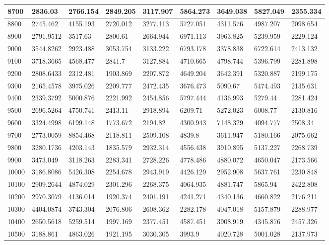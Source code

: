 \documentclass [11pt, proquest] {uwthesis}[2020/12/20]
\begin{document}
\begin{table}[]
\begin{tiny}
\begin{tabular}{|l|l|l|l|l|l|l|l|l|}
8700 & 2836.03 & 2766.154 & 2849.205 & 3117.907 & 5864.273 & 3649.038 & 5827.049 & 2355.334 \\ \hline
8800 & 2745.462 & 4155.193 & 2720.012 & 3277.113 & 5727.051 & 4311.576 & 4987.207 & 2098.654 \\ \hline
8900 & 2791.9512 & 3517.63 & 2800.61 & 2664.944 & 6971.113 & 3963.825 & 5239.959 & 2229.124 \\ \hline
9000 & 3544.8262 & 2923.488 & 3053.754 & 3133.222 & 6793.178 & 3378.838 & 6722.614 & 2413.132 \\ \hline
9100 & 3718.3665 & 4568.477 & 2841.7 & 3127.884 & 4710.665 & 4798.744 & 5396.799 & 2281.898 \\ \hline
9200 & 2808.6433 & 2312.481 & 1903.869 & 2207.872 & 4649.204 & 3642.391 & 5320.887 & 2199.175 \\ \hline
9300 & 2165.4578 & 3975.026 & 2209.777 & 2472.435 & 3676.473 & 5090.67 & 5474.493 & 2135.631 \\ \hline
9400 & 2339.3792 & 5000.876 & 2221.992 & 2454.856 & 5797.444 & 4136.993 & 5279.44 & 2281.424 \\ \hline
9500 & 2696.5264 & 4750.741 & 2413.11 & 2918.894 & 6209.71 & 5272.023 & 6008.77 & 2130.816 \\ \hline
9600 & 3324.4998 & 6199.148 & 1773.672 & 2194.82 & 4300.943 & 7148.329 & 4094.777 & 2508.34 \\ \hline
9700 & 2773.0059 & 8854.468 & 2118.811 & 2509.108 & 4839.8 & 3611.947 & 5180.166 & 2075.662 \\ \hline
9800 & 3280.1736 & 4203.143 & 1835.579 & 2932.314 & 4556.438 & 3910.895 & 5137.227 & 2268.739 \\ \hline
9900 & 3473.049 & 3118.263 & 2283.341 & 2728.226 & 4778.486 & 4880.072 & 4650.047 & 2173.566 \\ \hline
10000 & 3186.8086 & 5426.308 & 2254.678 & 2943.919 & 4426.129 & 2952.908 & 5637.761 & 2230.848 \\ \hline
10100 & 2909.2644 & 4874.029 & 2301.296 & 2268.375 & 4064.935 & 4881.747 & 5865.94 & 2422.808 \\ \hline
10200 & 2970.3079 & 4136.014 & 1920.374 & 2401.191 & 4241.271 & 4340.136 & 4660.822 & 2176.211 \\ \hline
10300 & 4404.0874 & 3743.304 & 2076.806 & 2608.362 & 2282.178 & 4047.018 & 5157.879 & 2288.977 \\ \hline
10400 & 2650.5618 & 5259.514 & 1997.169 & 2377.451 & 4587.451 & 3908.919 & 4345.876 & 2457.326 \\ \hline
10500 & 3188.861 & 4863.026 & 1921.195 & 3030.305 & 3993.9 & 4020.728 & 5001.028 & 2137.973 \\ \hline

\end{tabular}
\end{tiny}
\end{table}
\end{document}
